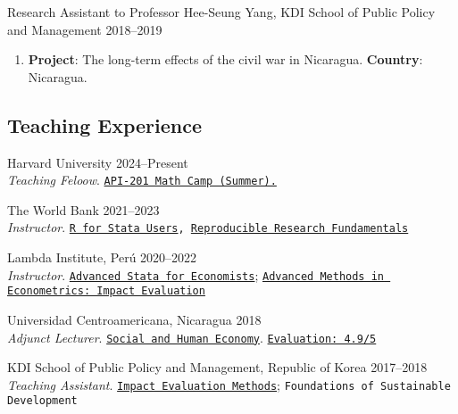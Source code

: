 \documentclass[a4paper, 10pt]{article}
\renewenvironment{itemize}{
  \begin{list}{}
    { \setlength{\itemsep}{5pt}
      \setlength{\parsep}{0pt}
      \setlength{\topsep}{0pt}
      \setlength{\leftmargin}{0em} } }{
  \end{list}}
\begin{document}
\begin{itemize}
\begin{enumerate}[leftmargin=10pt, label={}, nosep]
  \end{enumerate}
  \item Research Assistant to Professor Hee-Seung Yang, KDI School of Public Policy and Management \hfill 2018--2019  
  \begin{enumerate}[leftmargin=10pt, label={}, nosep]  
    \item {\small \textbf{Project}: The long-term effects of the civil war in Nicaragua. \newline \textbf{Country}: Nicaragua.}
  \end{enumerate}
\end{itemize}

\subsection*{Teaching Experience}
\begin{itemize}
  \item Harvard University
  \hfill 2024--Present \\
{\small \emph{Teaching Feloow}.
\texttt{\href{https://github.com/harvard-api209/summer-assignments}{API-201 Math
Camp (Summer).}}}
  \item The World Bank \hfill 2021--2023 \\  {\small \emph{Instructor}.} \texttt{\href{https://github.com/worldbank/dime-r-training}{R for Stata Users}, \href{https://github.com/dime-worldbank/rrf-course}{\texttt{Reproducible Research Fundamentals}}}

  \item Lambda Institute, Perú \hfill 2020--2022 \\ {\small \emph{Instructor}.} \texttt{\href{https://github.com/lambda-stata/course-materials}{Advanced Stata for Economists}}; \href{https://github.com/lambda-stata/econometria-avanzada}{\texttt{Advanced Methods in Econometrics: Impact Evaluation}}
 
  \item Universidad Centroamericana, Nicaragua \hfill 2018 \\ {\small \emph{Adjunct Lecturer}.} \texttt{\href{https://github.com/econsoc-uca}{Social and Human Economy}}. \texttt{\href{https://rrmaximiliano.github.io/docs/evaluation-esh.pdf}{Evaluation: 4.9/5}}
  
  \item KDI School of Public Policy and Management, Republic of Korea \hfill
  2017--2018 \\ {\small \emph{Teaching Assistant}.}
  \texttt{\href{https://www.dropbox.com/home/teaching_materials/kdischool/spring_2018_impact_evaluation}{Impact
  Evaluation Methods}}; \texttt{\textcolor{webbrown}{Foundations of Sustainable
  Development}}
\end{itemize}
\end{document}
